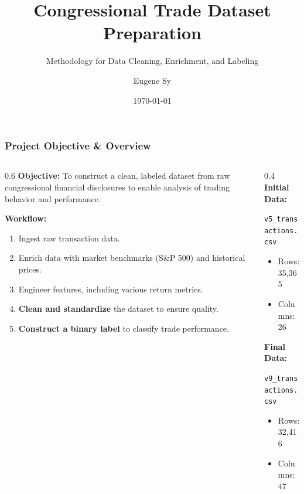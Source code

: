 \documentclass[aspectratio=169]{beamer}
\title{Congressional Trade Dataset Preparation}
\subtitle{Methodology for Data Cleaning, Enrichment, and Labeling}
\author{Eugene Sy}
\institute{National Taiwan University}
\date{\today}
\begin{document}
\begin{frame}
    \titlepage
\end{frame}

\begin{frame}
    \frametitle{Project Objective \& Overview}
    \begin{columns}
        \begin{column}{0.6\textwidth}
            \textbf{Objective:} To construct a clean, labeled dataset from raw congressional financial disclosures to enable analysis of trading behavior and performance.

            \vspace{1em}
            \textbf{Workflow:}
            \begin{enumerate}
                \item Ingest raw transaction data.
                \item Enrich data with market benchmarks (S\&P 500) and historical prices.
                \item Engineer features, including various return metrics.
                \item \textbf{Clean and standardize} the dataset to ensure quality.
                \item \textbf{Construct a binary label} to classify trade performance.
            \end{enumerate}
        \end{column}
        \begin{column}{0.4\textwidth}
            \textbf{Initial Data:}

            \texttt{v5\_transactions.csv}
            \begin{itemize}
                \item Rows: 35,365
                \item Columns: 26
            \end{itemize}
            \vspace{1em}
            \textbf{Final Data:}

            \texttt{v9\_transactions.csv}
            \begin{itemize}
                \item Rows: 32,416
                \item Columns: 47
            \end{itemize}
        \end{column}
    \end{columns}
\end{frame}
\end{document}
